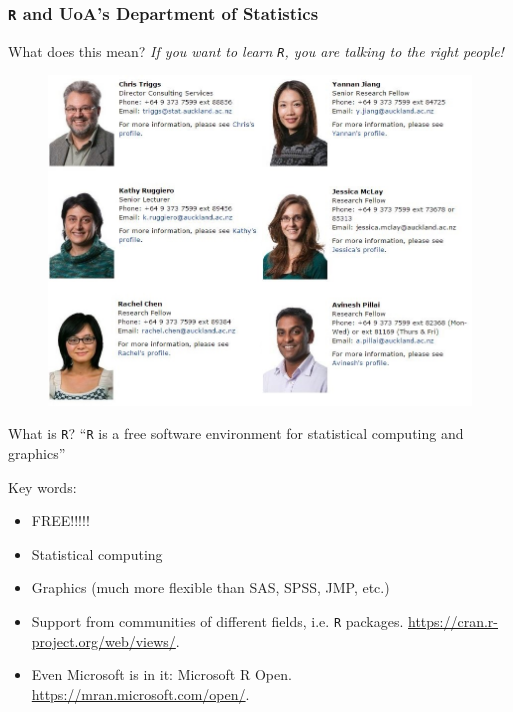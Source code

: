 \documentclass[handout]{beamer}\usepackage[]{graphicx}\usepackage[]{color}
\begin{document}
\begin{frame}
  \frametitle{\texttt{R} and UoA's Department of Statistics}
  \begin{block}{What does this mean?}
    \textit{If you want to learn \texttt{R}, you are talking to the right people!}
  \end{block}
  \begin{figure}[h]
    \centering
    \includegraphics[width = .7\textwidth, keepaspectratio]{groupNew.jpg}
  \end{figure}
\end{frame}

\begin{frame}
  \begin{block}{What is \texttt{R}?}
    ``\texttt{R} is a free software environment for statistical computing and graphics''
  \end{block}
Key words:
  \begin{itemize}
    \item FREE!!!!!
    \item Statistical computing
    \item Graphics (much more flexible than SAS, SPSS, JMP, etc.)
    \item Support from communities of different fields, i.e. \texttt{R} packages. \url{https://cran.r-project.org/web/views/}.
    \item Even Microsoft is in it: Microsoft R Open. \url{https://mran.microsoft.com/open/}.
  \end{itemize}
\end{frame}
\end{document}
